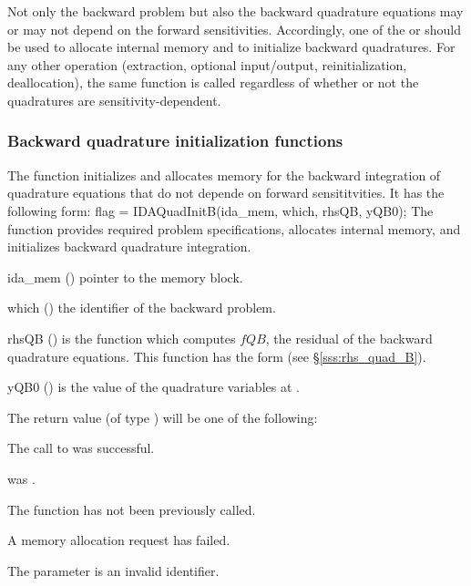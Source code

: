 Not only the backward problem but also the backward quadrature equations
may or may not depend on the forward sensitivities. Accordingly, one of the
 or  should be used to allocate internal
memory and to initialize backward quadratures.  For any other operation
(extraction, optional input/output, reinitialization, deallocation), the
same function is called regardless of whether or not the quadratures are
sensitivity-dependent.

\subsubsection{Backward quadrature initialization functions}
\label{sss:idaquadinitb}

The function  initializes and allocates memory for the backward
integration of quadrature equations that do not depende on forward sensititvities.
It has the following form:
{
flag = IDAQuadInitB(ida\_mem, which, rhsQB, yQB0);
}
{
  The function  provides required problem specifications,
  allocates internal memory, and initializes backward quadrature integration.
}
{
  \begin{args}
  \item[ida\_mem] ()
    pointer to the {\idas} memory block.
  \item[which] ()
    the identifier of the backward problem.
  \item[rhsQB] ()
    is the {\CC} function which computes $fQB$, the residual of the
    backward quadrature equations. This function has the form
    (see \S\ref{sss:rhs_quad_B}).
  \item[yQB0] ()
    is the value of the quadrature variables at .
  \end{args}
}
{
  The return value  (of type ) will be one of the following:
  \begin{args}
  \item[\Id{IDA\_SUCCESS}]
    The call to  was successful.
  \item[\Id{IDA\_MEM\_NULL}]
     was .
  \item[\Id{IDA\_NO\_ADJ}]
    The function  has not been previously called.
  \item[\Id{IDA\_MEM\_FAIL}]
    A memory allocation request has failed.
  \item[\Id{IDA\_ILL\_INPUT}]
    The parameter  is an invalid identifier.
  \end{args}
}
{}

